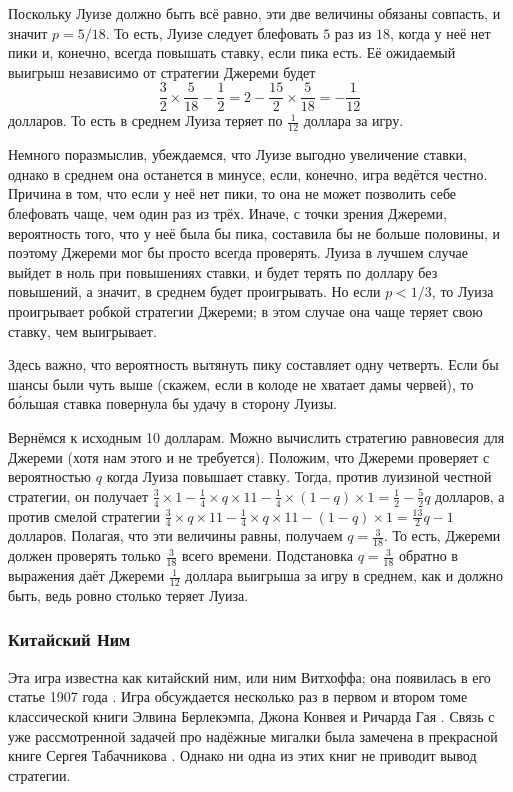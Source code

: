 Поскольку Луизе должно быть всё равно, эти две величины обязаны совпасть, и значит $p = 5/18$.
То есть, Луизе следует блефовать $5$ раз из $18$, когда у неё нет пики и, конечно, всегда повышать ставку, если пика есть.
Её ожидаемый выигрыш независимо от стратегии Джереми будет
\[\frac32\times\frac5{18}-\frac12=2-\frac{15}2\times\frac5{18}=-\frac1{12}\]
долларов.
То есть в среднем Луиза теряет по $\tfrac1{12}$ доллара за игру.

Немного поразмыслив, убеждаемся, что Луизе выгодно увеличение ставки,
однако в среднем она останется в минусе, если, конечно, игра ведётся честно.
Причина в том, что если у неё нет пики, то она не может позволить себе блефовать чаще, чем один раз из трёх.
Иначе, с точки зрения Джереми, вероятность того, что у неё была бы пика, составила бы не больше половины, и поэтому Джереми мог бы просто всегда проверять.
Луиза в лучшем случае выйдет в ноль при повышениях ставки, и будет терять по доллару без повышений, а значит, в среднем будет проигрывать.
Но если $p < 1/3$, то Луиза проигрывает робкой стратегии Джереми;
в этом случае она чаще теряет свою ставку, чем выигрывает.

Здесь важно, что вероятность вытянуть пику составляет одну четверть.
Если бы шансы были чуть выше (скажем, если в колоде не хватает дамы червей), то б\'{о}льшая ставка повернула бы удачу в сторону Луизы.

Вернёмся к исходным 10 долларам.
Можно вычислить стратегию равновесия для Джереми (хотя нам этого и не требуется).
Положим, что Джереми проверяет с вероятностью $q$ когда Луиза повышает ставку.
Тогда, против луизиной честной стратегии, он получает $\tfrac34 \times 1 - \tfrac14 \times q \times 11 - \tfrac14 \times (1 - q) \times 1 = \tfrac12 - \tfrac52q$ долларов,
а против смелой стратегии $\tfrac34 \times q \times 11 - \tfrac14 \times q \times 11 - (1 - q) \times 1 = \tfrac{13}2q - 1$ долларов.
Полагая, что эти величины равны, получаем $q = \tfrac3{18}$.
То есть, Джереми должен проверять только $\tfrac3{18}$ всего времени.
Подстановка $q = \tfrac3{18}$ обратно в выражения даёт Джереми $\tfrac1{12}$ доллара выигрыша за игру в среднем, как и должно быть, ведь ровно столько теряет Луиза.

\subsubsection*{Китайский Ним}

Эта игра известна как китайский ним, или ним  Витхоффа;
она появилась в его статье 1907 года \cite{60}.
Игра обсуждается несколько раз в первом и втором томе классической книги Элвина Берлекэмпа, Джона Конвея и Ричарда  Гая \cite{4}.
Связь с уже рассмотренной задачей про надёжные мигалки была замечена в прекрасной книге Сергея Табачникова \cite{56}.
Однако ни одна из этих книг не приводит вывод стратегии.


